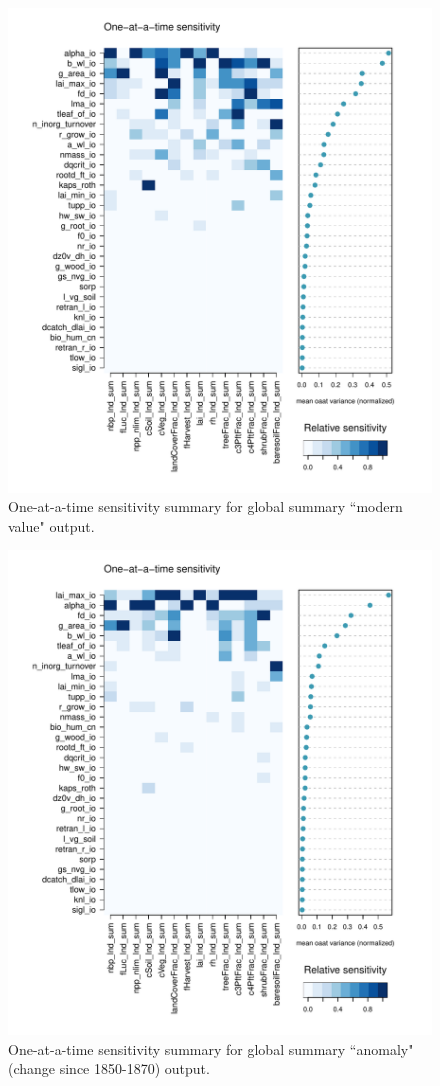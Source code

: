 \documentclass[gmd, manuscript]{copernicus}
\begin{document}
\begin{figure}[t]
\includegraphics[width=12cm]{./figs/oat_var_sensmat_level1a_wave01_Y}
\caption{One-at-a-time sensitivity summary for global summary ``modern value" output.}
\label{fig:oat_var_sensmat_level1a_wave01_Y}
\end{figure}

\begin{figure}[t]
\includegraphics[width=12cm]{./figs/oat_var_sensmat_level1a_wave01_YAnom}
\caption{One-at-a-time sensitivity summary for global summary ``anomaly" (change since 1850-1870) output.}
\label{fig:oat_var_sensmat_level1a_wave01_Anom}
\end{figure}
\end{document}

